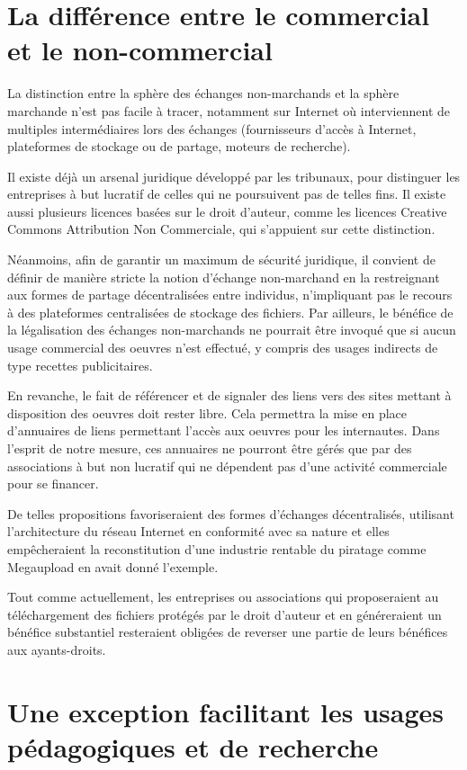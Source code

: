 \section{La différence entre le commercial et le non-commercial}
La distinction entre la sphère des échanges non-marchands et la sphère marchande n'est pas facile à tracer, notamment sur Internet où interviennent de multiples intermédiaires lors des échanges (fournisseurs d'accès à Internet, plateformes de stockage ou de partage, moteurs de recherche).  
 
Il existe déjà un arsenal juridique développé par les tribunaux, pour distinguer les entreprises à but lucratif de celles qui ne poursuivent pas de telles fins. Il existe aussi plusieurs licences basées sur le droit d’auteur, comme les licences Creative Commons Attribution Non Commerciale, qui s’appuient sur cette distinction.

Néanmoins, afin de garantir un maximum de sécurité juridique, il convient de définir de manière stricte la notion d'échange non-marchand en la restreignant aux formes de partage décentralisées entre individus, n'impliquant pas le recours à des plateformes centralisées de stockage des fichiers. Par ailleurs, le bénéfice de la légalisation des échanges non-marchands ne pourrait être invoqué que si aucun usage commercial des oeuvres n'est effectué, y compris des usages indirects de type recettes publicitaires.  

En revanche, le fait de référencer et de signaler des liens vers des sites mettant à disposition des oeuvres doit rester libre. Cela permettra la mise en place d'annuaires de liens permettant l'accès aux oeuvres pour les internautes. Dans l'esprit de notre mesure, ces annuaires ne pourront être gérés que par des associations à but non lucratif qui ne dépendent pas d'une activité commerciale pour se financer.

De telles propositions favoriseraient des formes d'échanges décentralisés, utilisant l'architecture du réseau Internet en conformité avec sa nature et elles empêcheraient la reconstitution d’une industrie rentable du piratage comme Megaupload en avait donné l'exemple.

Tout comme actuellement, les entreprises ou associations qui proposeraient au téléchargement des fichiers protégés par le droit d'auteur et en généreraient un bénéfice substantiel resteraient obligées de reverser une partie de leurs bénéfices aux ayants-droits. 

\section{Une exception facilitant les usages pédagogiques et de recherche}

